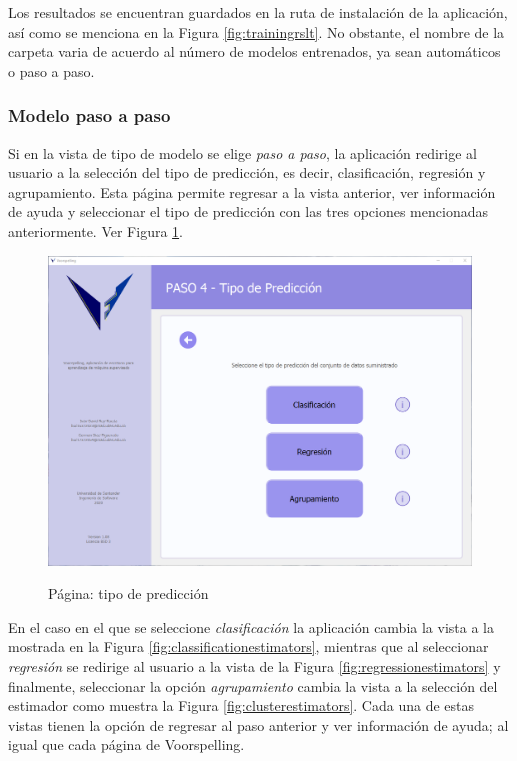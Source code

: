 Los resultados se encuentran guardados en la ruta de instalación de la aplicación, así como se menciona en la Figura \ref{fig:trainingrslt}. No obstante, el nombre de la carpeta varia de acuerdo al número de modelos entrenados, ya sean automáticos o paso a paso.

\subsubsection{Modelo paso a paso}

Si en la vista de tipo de modelo se elige \textit{paso a paso}, la aplicación redirige al usuario a la selección del tipo de predicción, es decir, clasificación, regresión y agrupamiento. Esta página permite regresar a la vista anterior, ver información de ayuda y seleccionar el tipo de predicción con las tres opciones mencionadas anteriormente. Ver Figura \ref{fig:predictiontype}.

\begin{figure}[H]
    \centering
    \caption{Página: tipo de predicción}
    \includegraphics[width=\textwidth]{views/prediction_type.png}
    \label{fig:predictiontype}
\end{figure}

En el caso en el que se seleccione \textit{clasificación} la aplicación cambia la vista a la mostrada en la Figura \ref{fig:classificationestimators}, mientras que al seleccionar \textit{regresión} se redirige al usuario a la vista de la Figura \ref{fig:regressionestimators} y finalmente, seleccionar la opción \textit{agrupamiento} cambia la vista a la selección del estimador como muestra la Figura \ref{fig:clusterestimators}. Cada una de estas vistas tienen la opción de regresar al paso anterior y ver información de ayuda; al igual que cada página de Voorspelling.

